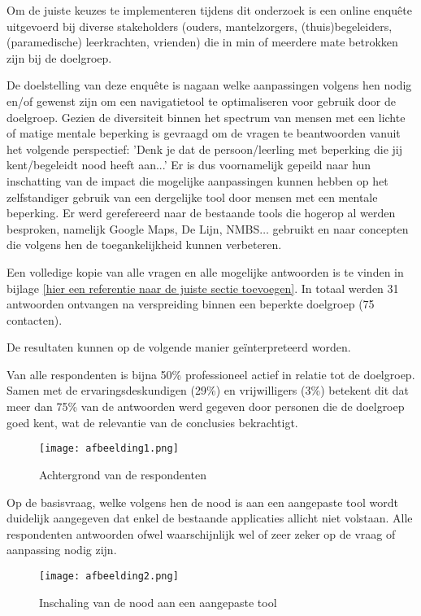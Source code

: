 Om de juiste keuzes te implementeren tijdens dit onderzoek is een online enquête uitgevoerd bij diverse stakeholders (ouders, mantelzorgers, (thuis)begeleiders, (paramedische) leerkrachten, vrienden) die in min of meerdere mate betrokken zijn bij de doelgroep.

De doelstelling van deze enquête is nagaan welke aanpassingen volgens hen nodig en/of gewenst zijn om een navigatietool te optimaliseren voor gebruik door de doelgroep. Gezien de diversiteit binnen het spectrum van mensen met een lichte of matige mentale beperking is gevraagd om de vragen te beantwoorden vanuit het volgende perspectief: 'Denk je dat de persoon/leerling met beperking die jij kent/begeleidt nood heeft aan...' Er is dus voornamelijk gepeild naar hun inschatting van de impact die mogelijke aanpassingen kunnen hebben op het zelfstandiger gebruik van een dergelijke tool door mensen met een mentale beperking. Er werd gerefereerd naar de bestaande tools die hogerop al werden besproken, namelijk Google Maps, De Lijn, NMBS$\ldots$ gebruikt en naar concepten die volgens hen de toegankelijkheid kunnen verbeteren.

Een volledige kopie van alle vragen en alle mogelijke antwoorden is te vinden in bijlage \ref{hier een referentie naar de juiste sectie toevoegen}. In totaal werden 31 antwoorden ontvangen na verspreiding binnen een beperkte doelgroep (75 contacten).

De resultaten kunnen op de volgende manier geïnterpreteerd worden.

Van alle respondenten is bijna 50\% professioneel actief in relatie tot de doelgroep. Samen met de ervaringsdeskundigen (29\%) en vrijwilligers (3\%) betekent dit dat meer dan 75\% van de antwoorden werd gegeven door personen die de doelgroep goed kent, wat de relevantie van de conclusies bekrachtigt.

\begin{figure}[h]
    \centering
    \texttt{[image: afbeelding1.png]}
    \caption{Achtergrond van de respondenten}
    \label{fig:achtergrond}
\end{figure}

Op de basisvraag, welke volgens hen de nood is aan een aangepaste tool wordt duidelijk aangegeven dat enkel de bestaande applicaties allicht niet volstaan. Alle respondenten antwoorden ofwel waarschijnlijk wel of zeer zeker op de vraag of aanpassing nodig zijn.

\begin{figure}[h]
    \centering
    \texttt{[image: afbeelding2.png]}
    \caption{Inschaling van de nood aan een aangepaste tool}
    \label{fig:inschaling}
\end{figure}

